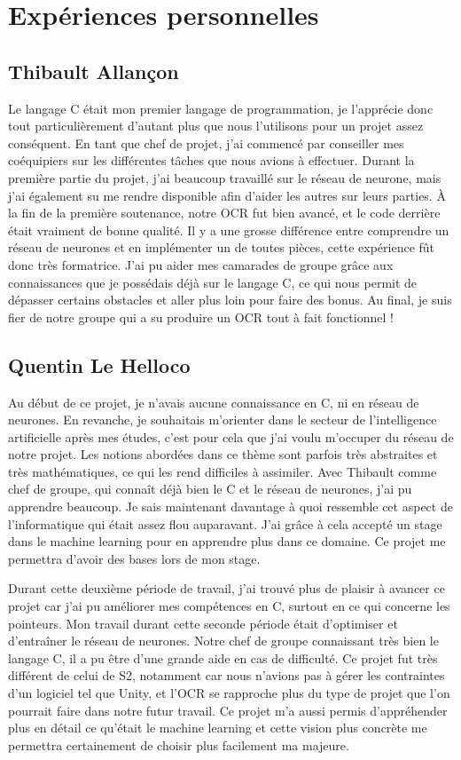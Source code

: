 \chapter{Expériences personnelles}

\section{Thibault Allançon}

Le langage C était mon premier langage de programmation, je l’apprécie donc tout
particulièrement d’autant plus que nous l’utilisons pour un projet assez
conséquent. En tant que chef de projet, j’ai commencé par conseiller mes
coéquipiers sur les différentes tâches que nous avions à effectuer. Durant la
première partie du projet, j’ai beaucoup travaillé sur le réseau de neurone,
mais j’ai également su me rendre disponible afin d’aider les autres sur leurs
parties. À la fin de la première soutenance, notre OCR fut bien avancé, et le
code derrière était vraiment de bonne qualité. Il y a une grosse différence
entre comprendre un réseau de neurones et en implémenter un de toutes pièces,
cette expérience fût donc très formatrice. J’ai pu aider mes camarades de groupe
grâce aux connaissances que je possédais déjà sur le langage C, ce qui nous
permit de dépasser certains obstacles et aller plus loin pour faire des bonus.
Au final, je suis fier de notre groupe qui a su produire un OCR tout à fait
fonctionnel !

\section{Quentin Le Helloco}

Au début de ce projet, je n’avais aucune connaissance en C, ni en réseau de
neurones. En revanche, je souhaitais m’orienter dans le secteur de
l’intelligence artificielle après mes études, c’est pour cela que j’ai voulu
m’occuper du réseau de notre projet. Les notions abordées dans ce thème sont
parfois très abstraites et très mathématiques, ce qui les rend difficiles à
assimiler. Avec Thibault comme chef de groupe, qui connaît déjà bien le C et le
réseau de neurones, j’ai pu apprendre beaucoup. Je sais maintenant davantage à
quoi ressemble cet aspect de l’informatique qui était assez flou auparavant.
J’ai grâce à cela accepté un stage dans le machine learning pour en apprendre
plus dans ce domaine. Ce projet me permettra d’avoir des bases lors de mon
stage.

Durant cette deuxième période de travail, j’ai trouvé plus de plaisir à avancer
ce projet car j’ai pu améliorer mes compétences en C, surtout en ce qui concerne
les pointeurs. Mon travail durant cette seconde période était d’optimiser et
d'entraîner le réseau de neurones. Notre chef de groupe connaissant très bien le
langage C, il a pu être d’une grande aide en cas de difficulté. Ce projet fut
très différent de celui de S2, notamment car nous n’avions pas à gérer les
contraintes d’un logiciel tel que Unity, et l’OCR se rapproche plus du type de
projet que l’on pourrait faire dans notre futur travail. Ce projet m’a aussi
permis d’appréhender plus en détail ce qu’était le machine learning et cette
vision plus concrète me permettra certainement de choisir plus facilement ma
majeure.

